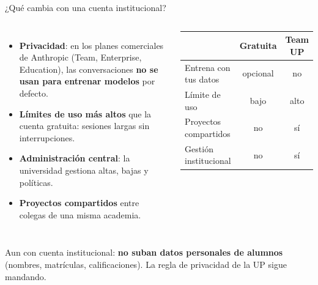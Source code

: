 \documentclass[aspectratio=169,10pt]{beamer}
\begin{document}
\begin{frame}{¿Qué cambia con una cuenta institucional?}
\begin{columns}[T]
\begin{itemize}
  \item \textbf{Privacidad}: en los planes comerciales de Anthropic (Team, Enterprise, Education), las conversaciones \textbf{no se usan para entrenar modelos} por defecto.
  \item \textbf{Límites de uso más altos} que la cuenta gratuita: sesiones largas sin interrupciones.
  \item \textbf{Administración central}: la universidad gestiona altas, bajas y políticas.
  \item \textbf{Proyectos compartidos} entre colegas de una misma academia.
\end{itemize}
\begin{tcolorbox}[enhanced,colback=white,colframe=Md,arc=2mm,
  title={\faUniversity\ Cuenta personal vs.\ UP},fonttitle=\bfseries\color{white},colbacktitle=Md]
\scriptsize
\begin{tabularx}{\linewidth}{@{}Xcc@{}}
\toprule
 & \textbf{Gratuita} & \textbf{Team UP}\\
\midrule
Entrena con tus datos & opcional & no\\
Límite de uso & bajo & alto\\
Proyectos compartidos & no & sí\\
Gestión institucional & no & sí\\
\bottomrule
\end{tabularx}
\end{tcolorbox}
\end{columns}
\vspace{6pt}
\begin{warnbox}
Aun con cuenta institucional: \textbf{no suban datos personales de alumnos} (nombres, matrículas, calificaciones). La regla de privacidad de la UP sigue mandando.
\end{warnbox}
\end{frame}
\end{document}
